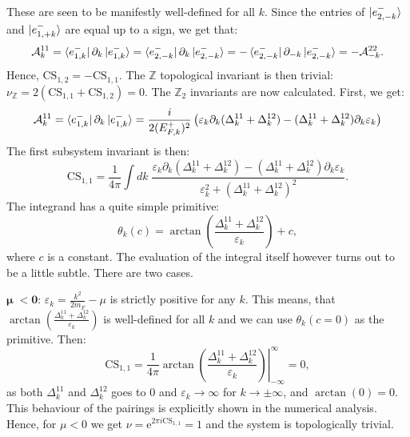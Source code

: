 These are seen to be manifestly well-defined for all $k$. Since the entries of $\ket{e^{-}_{2,-k}}$ and $\ket{e^{-}_{1,+k}}$ are equal up to a sign, we get that:
\begin{equation}
\mathcal{A}^{11}_k = \bra{e^{-}_{1,k}}\partial_k\ket{e^{-}_{1,k}} = \bra{e^{-}_{2,-k}}\partial_k\ket{e^{-}_{2,-k}} = - \bra{e^{-}_{2,-k}}\partial_{-k}\ket{e^{-}_{2,-k}} = -\mathcal{A}^{22}_{-k}. \nonumber
\end{equation}
Hence, $\text{CS}_{1,2} = - \text{CS}_{1,1}$. The $\mathbb{Z}$ topological invariant is then trivial: $\nu_{\mathbb{Z}} = 2(\text{CS}_{1,1} + \text{CS}_{1,2}) = 0$. The $\mathbb{Z}_2$ invariants are now calculated. First, we get:
\begin{equation}
\mathcal{A}^{11}_k = \bra{e^{-}_{1,k}}\partial_k\ket{e^{-}_{1,k}} = \frac{i}{2(E^{+}_{F,k})^2}\left(\varepsilon_k\partial_k(\Delta^{11}_k + \Delta^{12}_k) - (\Delta^{11}_k + \Delta^{12}_k)\partial_k \varepsilon_k\right) \nonumber
\end{equation}
The first subsystem invariant is then:
\begin{equation}
\text{CS}_{1,1} = \frac{1}{4\pi}\int dk \; \frac{\varepsilon_k\partial_k(\Delta^{11}_k + \Delta^{12}_k) - (\Delta^{11}_k + \Delta^{12}_k)\partial_k \varepsilon_k}{\varepsilon_k^2 + (\Delta^{11}_k + \Delta^{12}_k)^2}.
\label{eq.CS11integralform}
\end{equation}
The integrand has a quite simple primitive:
\begin{equation}
\theta_k(c) = \arctan\left(\frac{\Delta^{11}_k + \Delta^{12}_k }{\varepsilon_k}\right) + c,
\label{eq.thetak.def}
\end{equation}
where $c$ is a constant. The evaluation of the integral itself however turns out to be a little subtle. There are two cases.

$\boldsymbol\mu \;\mathbf{< 0}$: $\varepsilon_k = \frac{k^2}{2m_F} - \mu$ is strictly positive for any $k$. This means, that $\arctan\left(\frac{\Delta^{11}_k + \Delta^{12}_k }{\varepsilon_k}\right)$ is well-defined for all $k$ and we can use $\theta_k(c = 0)$ as the primitive. Then:
\begin{equation}
\text{CS}_{1,1} = \frac{1}{4\pi}\left.\arctan\left(\frac{\Delta^{11}_k + \Delta^{12}_k }{\varepsilon_k}\right)\right|^{\infty}_{-\infty} = 0, \nonumber
\end{equation}
as both $\Delta^{11}_k$ and $\Delta^{12}_k$ goes to $0$ and $\varepsilon_k \to \infty$ for $k\to \pm \infty$, and $\arctan(0) = 0$. This behaviour of the pairings is explicitly shown in the numerical analysis. Hence, for $\mu < 0$ we get $\nu = \text{e}^{2\pi i\text{CS}_{1,1}} = 1$ and the system is topologically trivial. 

